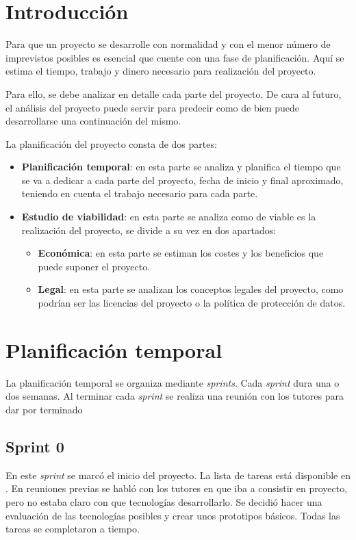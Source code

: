 
\section{Introducción}
Para que un proyecto se desarrolle con normalidad y con el menor número de
imprevistos posibles es esencial que cuente con una fase de planificación. Aquí
se estima el tiempo, trabajo y dinero necesario para realización del proyecto.

Para ello, se debe analizar en detalle cada parte del proyecto. De cara al 
futuro, el análisis del proyecto puede servir para predecir como de bien puede 
desarrollarse una continuación del mismo.

La planificación del proyecto consta de dos partes:
\begin{itemize}
	\tightlist
	\item \textbf{Planificación temporal}: en esta parte se analiza y planifica el
	tiempo que se va a dedicar a cada parte del proyecto, fecha de inicio y final
	aproximado, teniendo en cuenta el trabajo necesario para cada parte.
	\item \textbf{Estudio de viabilidad}: en esta parte se analiza como de viable
	es la realización del proyecto, se divide a su vez en dos apartados:
	
	\begin{itemize}
		\tightlist
		\item \textbf{Económica}: en esta parte se estiman los costes y los beneficios
		que puede suponer el proyecto.
		\item \textbf{Legal}: en esta parte se analizan los conceptos legales del
		proyecto, como podrían ser las licencias del proyecto o la política de
		protección de datos.
	\end{itemize}
\end{itemize}

\section{Planificación temporal}
La planificación temporal se organiza mediante \textit{sprints}. Cada
\textit{sprint} dura una o dos semanas. Al terminar cada \textit{sprint} se
realiza una reunión con los tutores para dar por terminado

\subsection{Sprint 0}
En este \textit{sprint} se marcó el inicio del proyecto. La lista de tareas está
disponible en
. En reuniones previas se habló con los tutores en que iba a consistir en
proyecto, pero no estaba claro con que tecnologías desarrollarlo. Se decidió
hacer una evaluación de las tecnologías posibles y crear unos prototipos
básicos. Todas las tareas se completaron a tiempo.\\

